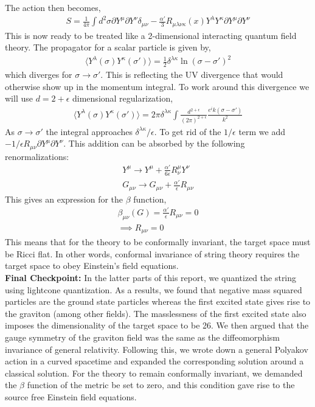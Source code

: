 \documentclass{article}
\begin{document}
The action then becomes,
\begin{align}
    S = \frac{1}{4\pi} \int d^2\sigma \partial Y^\mu \partial Y^\nu \delta_{\mu\nu}-\frac{\alpha'}{3}R_{\mu\lambda\nu\kappa}(x)Y^\lambda Y^\kappa\partial Y^\mu \partial Y^\nu
\end{align}
This is now ready to be treated like a 2-dimensional interacting quantum field theory. The propagator for a scalar particle is given by,
\begin{align}
    \langle{Y^\lambda(\sigma)Y^\kappa(\sigma')}\rangle=\frac{1}{2}\delta^{\lambda\kappa}\ln(\sigma-\sigma')^2
\end{align}
which diverges for $\sigma\rightarrow\sigma'$. This is reflecting the UV divergence that would otherwise show up in the momentum integral. To work around this divergence we will use $d=2+\epsilon$ dimensional regularization,
\begin{align}
\langle{Y^\lambda(\sigma)Y^\kappa(\sigma')}\rangle=2\pi\delta^{\lambda\kappa}\int \frac{d^{2+\epsilon}}{(2\pi)^{2+\epsilon}}\frac{e^ik(\sigma-\sigma')}{k^2}
\end{align}
As $\sigma\rightarrow\sigma'$ the integral approaches $\delta^{\lambda\kappa}/\epsilon$. To get rid of the $1/\epsilon$ term we add $-1/\epsilon R_{\mu\nu}\partial Y^\mu \partial Y^\nu$. This addition can be absorbed by the following renormalizations:
\begin{align}
    Y^\mu\rightarrow Y^\mu+\frac{\alpha'}{6\epsilon}R^\mu_\nu Y^\nu\\
    G_{\mu\nu}\rightarrow G_{\mu\nu}+\frac{\alpha'}{\epsilon}R_{\mu\nu}
\end{align}
This gives an expression for the $\beta$ function,
\begin{align}
    \beta_{\mu\nu}(G) = \frac{\alpha'}{\epsilon}R_{\mu\nu}=0\\
    \implies R_{\mu\nu}=0
\end{align}
This means that for the theory to be conformally invariant, the target space must be Ricci flat. In other words, conformal invariance of string theory requires the target space to obey Einstein's field equations.\\

\textbf{Final Checkpoint:} In the latter parts of this report, we quantized the string using lightcone quantization. As a results, we found that negative mass squared particles are the ground state particles whereas the first excited state gives rise to the graviton (among other fields). The masslessness of the first excited state also imposes the dimensionality of the target space to be 26. We then argued that the gauge symmetry of the graviton field was the same as the diffeomorphism invariance of general relativity. Following this, we wrote down a general Polyakov action in a curved spacetime and expanded the corresponding solution around a classical solution. For the theory to remain conformally invariant, we demanded the $\beta$ function of the metric be set to zero, and this condition gave rise to the source free Einstein field equations.
\end{document}
